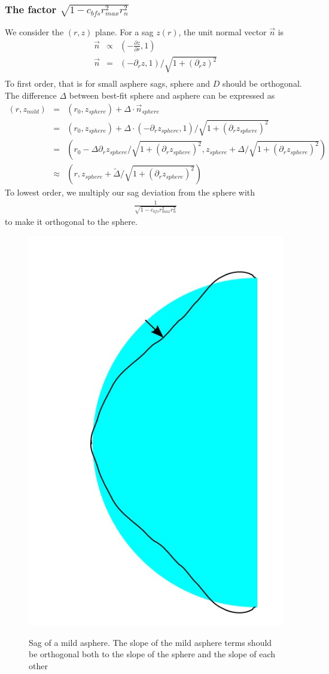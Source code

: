\documentclass[10pt]{revtex4-1}
\renewcommand\r{r}
\newcommand\rmax{r_{max}}
\newcommand\rnorm{r_{n}}
\begin{document}
\subsubsection{The factor $\sqrt{1 - c_{bfs} \rmax^2 \rnorm^2}$}
We consider the $(\r,z)$ plane. For a sag $z(\r)$, the unit normal vector $\vec{n}$ is 
\begin{eqnarray}
  \vec{n} &\propto& (-\frac{\partial z}{\partial \r}, 1) \\
  \vec{n} &=& (-\partial_\r z, 1) / \sqrt{1+(\partial_\r z)^2} \\
	\end{eqnarray}
To first order, that is for small asphere sags, sphere and $D$ should be orthogonal. The difference $\Delta$ between best-fit sphere and asphere can be expressed as
\begin{eqnarray}
  (\r,z_{mild}) 
	&=& (\r_0,z_{sphere}) + \Delta \cdot \vec{n}_{sphere} \\
	&=& (\r_0,z_{sphere}) + \Delta \cdot (-\partial_\r z_{sphere}, 1) / \sqrt{1+(\partial_\r z_{sphere})^2} \\
	&=& (\r_0 - \Delta \partial_\r z_{sphere}/ \sqrt{1+(\partial_\r z_{sphere})^2},z_{sphere} + \Delta / \sqrt{1+(\partial_\r z_{sphere})^2}) \\
	&\approx& (\r,z_{sphere} + \tilde{\Delta} / \sqrt{1+(\partial_\r z_{sphere})^2})
\end{eqnarray}
To lowest order, we multiply our sag deviation from the sphere with
\begin{eqnarray}
  \frac{1}{\sqrt{1 - c_{bfs} \rmax^2 \rnorm^2}}
\end{eqnarray}
to make it orthogonal to the sphere.

\begin{figure}
  \centering
  \includegraphics[width=0.3\columnwidth]{mild_asphere}\\
  \caption{Sag of a mild asphere. The slope of the mild asphere terms should be orthogonal both to the slope of the sphere and the slope of each other}
  \label{fig:mild_asphere}
\end{figure}
\end{document}
